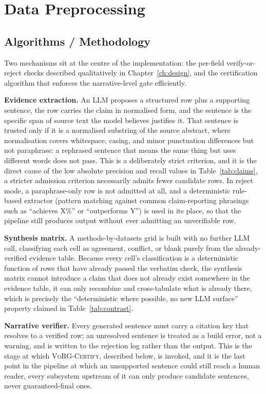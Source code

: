 \documentclass[12pt,a4paper]{report}
\begin{document}
\section{Data Preprocessing}

\subsection{Algorithms / Methodology}
Two mechanisms sit at the centre of the implementation: the per-field
verify-or-reject checks described qualitatively in Chapter~\ref{ch:design}, and
the certification algorithm that enforces the narrative-level gate
efficiently.

\textbf{Evidence extraction.} An LLM proposes a structured row plus a
supporting sentence, the row carries the claim in normalised form, and the
sentence is the specific span of source text the model believes justifies it.
That sentence is trusted only if it is a normalised substring of the source
abstract, where normalisation covers whitespace, casing, and minor
punctuation differences but not paraphrase: a rephrased sentence that means
the same thing but uses different words does not pass. This is a deliberately
strict criterion, and it is the direct cause of the low absolute precision and
recall values in Table~\ref{tab:claims}, a stricter admission criterion
necessarily admits fewer candidate rows. In reject mode, a paraphrase-only row
is not admitted at all, and a deterministic rule-based extractor (pattern
matching against common claim-reporting phrasings such as ``achieves X\%'' or
``outperforms Y'') is used in its place, so that the pipeline still produces
output without ever admitting an unverifiable row.

\textbf{Synthesis matrix.} A methods-by-datasets grid is built with no further
LLM call, classifying each cell as agreement, conflict, or blank purely from
the already-verified evidence table. Because every cell's classification is a
deterministic function of rows that have already passed the verbatim check,
the synthesis matrix cannot introduce a claim that does not already exist
somewhere in the evidence table, it can only recombine and cross-tabulate
what is already there, which is precisely the ``deterministic where possible,
no new LLM surface'' property claimed in Table~\ref{tab:contrast}.

\textbf{Narrative verifier.} Every generated sentence must carry a citation
key that resolves to a verified row; an unresolved sentence is treated as a
build error, not a warning, and is written to the rejection log rather than
the output. This is the stage at which \textsc{VoRG-Certify}, described
below, is invoked, and it is the last point in the pipeline at which an
unsupported sentence could still reach a human reader, every subsystem
upstream of it can only produce candidate sentences, never guaranteed-final
ones.
\end{document}

